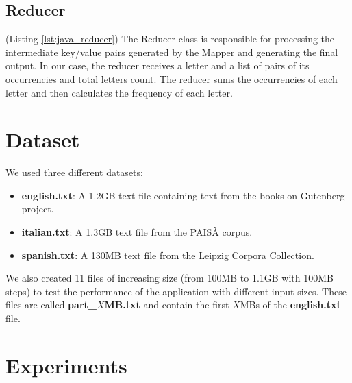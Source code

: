 \documentclass{article}
\begin{document}
\begin{multicols}{2}
\subsection{Reducer}
    (Listing \ref{lst:java_reducer}) 
    The Reducer class is responsible for processing the intermediate key/value pairs generated by the Mapper
    and generating the final output. In our case, the reducer receives a letter and a list of pairs of 
    its occurrencies and total letters count. The reducer sums the occurrencies of each letter and then 
    calculates the frequency of each letter.
\section{Dataset}
    We used three different datasets:
    \begin{itemize}
        \item \textbf{english.txt}: A 1.2GB text file containing text from the books on Gutenberg project.
        \item \textbf{italian.txt}: A 1.3GB text file from the PAISÀ corpus.
        \item \textbf{spanish.txt}: A 130MB text file from the Leipzig Corpora Collection.
    \end{itemize}
    We also created 11 files of increasing size (from 100MB to 1.1GB with 100MB steps) to test the performance
    of the application with different input sizes. These files are called \textbf{part\_$X$MB.txt} and 
    contain the first $X$MBs of the \textbf{english.txt} file. 
\section{Experiments}

\end{multicols}
\end{document}
